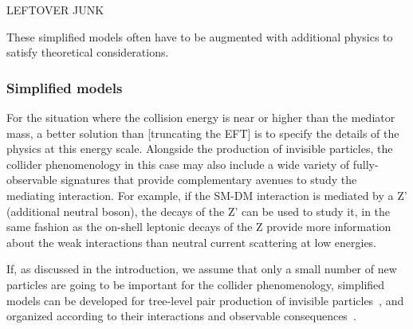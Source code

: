 
LEFTOVER JUNK

These simplified models often have to be augmented with additional physics to satisfy theoretical considerations. 

\subsubsection{Simplified models}
\label{sub:simplifiedModels}

For the situation where the collision energy is near or higher than the mediator mass, 
a better solution than [truncating the EFT] is to specify the details
of the physics at this energy scale. Alongside the production of invisible particles, 
the collider phenomenology in this case may also include a wide variety of fully-observable
signatures that provide complementary avenues to study the mediating interaction.
For example, if the SM-DM interaction is mediated by a Z’ (additional neutral boson),
the decays of the Z’ can be used to study it, in the same fashion as the on-shell
leptonic decays of the Z provide more information about the weak interactions than 
neutral current scattering at low energies.

If, as discussed in the introduction, we assume that only a small number of new particles are going to be
important for the collider phenomenology, simplified models can be developed for tree-level pair
production of invisible particles~\cite{Alwall:2008ag, Agrawal:2010fh, Alves:2011wf, Choudhury:2015lha}, and %
organized according to their interactions and observable consequences~\cite{Abercrombie:2015wmb}.


